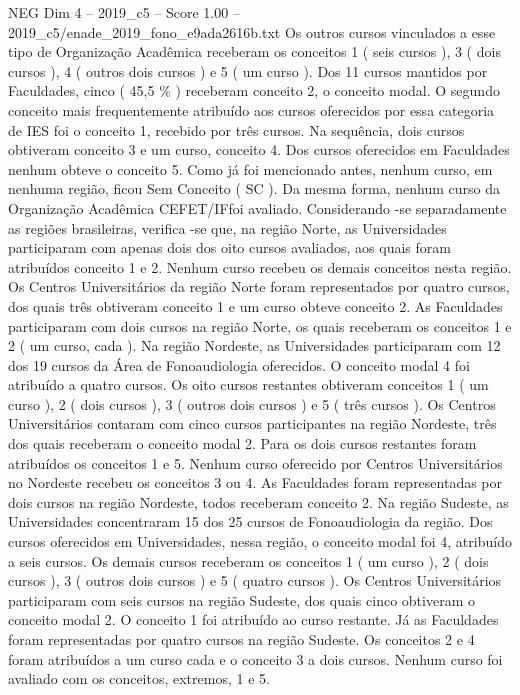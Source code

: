 \begin{textsample}{NEG Dim 4 – 2019\_c5 – Score 1.00 – 2019\_c5/enade\_2019\_fono\_e9ada2616b.txt}
Os outros cursos vinculados a esse tipo de Organização Acadêmica receberam os conceitos 1 ( seis cursos ), 3 ( dois cursos ), 4 ( outros dois cursos ) e 5 ( um curso ).
Dos 11 cursos mantidos por Faculdades, cinco ( 45,5 \% ) receberam conceito 2, o conceito modal.
O segundo conceito mais frequentemente atribuído aos cursos oferecidos por essa categoria de IES foi o conceito 1, recebido por três cursos.
Na sequência, dois cursos obtiveram conceito 3 e um curso, conceito 4.
Dos cursos oferecidos em Faculdades nenhum obteve o conceito 5.
Como já foi mencionado antes, nenhum curso, em nenhuma região, ficou Sem Conceito ( SC ).
Da mesma forma, nenhum curso da Organização Acadêmica CEFET/IFfoi avaliado.
Considerando -se separadamente as regiões brasileiras, verifica -se que, na região Norte, as Universidades participaram com apenas dois dos oito cursos avaliados, aos quais foram atribuídos conceito 1 e 2.
Nenhum curso recebeu os demais conceitos nesta região.
Os Centros Universitários da região Norte foram representados por quatro cursos, dos quais três obtiveram conceito 1 e um curso obteve conceito 2.
As Faculdades participaram com dois cursos na região Norte, os quais receberam os conceitos 1 e 2 ( um curso, cada ).
Na região Nordeste, as Universidades participaram com 12 dos 19 cursos da Área de Fonoaudiologia oferecidos.
O conceito modal 4 foi atribuído a quatro cursos.
Os oito cursos restantes obtiveram conceitos 1 ( um curso ), 2 ( dois cursos ), 3 ( outros dois cursos ) e 5 ( três cursos ).
Os Centros Universitários contaram com cinco cursos participantes na região Nordeste, três dos quais receberam o conceito modal 2.
Para os dois cursos restantes foram atribuídos os conceitos 1 e 5.
Nenhum curso oferecido por Centros Universitários no Nordeste recebeu os conceitos 3 ou 4.
As Faculdades foram representadas por dois cursos na região Nordeste, todos receberam conceito 2.
Na região Sudeste, as Universidades concentraram 15 dos 25 cursos de Fonoaudiologia da região.
Dos cursos oferecidos em Universidades, nessa região, o conceito modal foi 4, atribuído a seis cursos.
Os demais cursos receberam os conceitos 1 ( um curso ), 2 ( dois cursos ), 3 ( outros dois cursos ) e 5 ( quatro cursos ).
Os Centros Universitários participaram com seis cursos na região Sudeste, dos quais cinco obtiveram o conceito modal 2.
O conceito 1 foi atribuído ao curso restante.
Já as Faculdades foram representadas por quatro cursos na região Sudeste.
Os conceitos 2 e 4 foram atribuídos a um curso cada e o conceito 3 a dois cursos.
Nenhum curso foi avaliado com os conceitos, extremos, 1 e 5.

\end{textsample}
